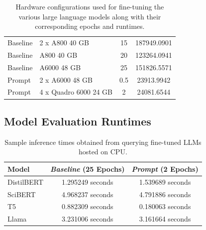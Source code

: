 \begin{table}[h]
\begin{tabular}{l l c c}
        Baseline & 2 x A800 40 GB & 15 & 187949.0901 \\
        Baseline & A800 40 GB & 20 & 123264.0941 \\
        Baseline & A6000 48 GB & 25 & 151826.5571 \\
        Prompt & 2 x A6000 48 GB & 0.5 & 23913.9942 \\
        Prompt & 4 x Quadro 6000 24 GB & 2 & 24081.6544 \\
    \end{tabular}
    \caption{
        Hardware configurations used for fine-tuning the various large language
        models along with their corresponding epochs and runtimes.
    }
    \label{tab:model_training_configurations}
\end{table}
\clearpage

\subsection{Model Evaluation Runtimes}
\begin{table}[h]
    \centering
    \begin{tabular}{l c c}
        \hline
        \textbf{Model}  & \textbf{\textit{Baseline} (25 Epochs)} & \textbf{\textit{Prompt} (2 Epochs)} \\
        \hline
        DistilBERT & 1.295249 seconds & 1.539689 seconds\\
        SciBERT & 4.968237 seconds & 4.791886 seconds \\
        T5 & 0.882309 seconds & 0.180063 seconds \\
        Llama & 3.231006 seconds & 3.161664 seconds \\
    \end{tabular}
    \caption{Sample inference times obtained from querying fine-tuned LLMs hosted on CPU.}
    \label{tab:model_evaluation_runtimes}
\end{table}
\clearpage

